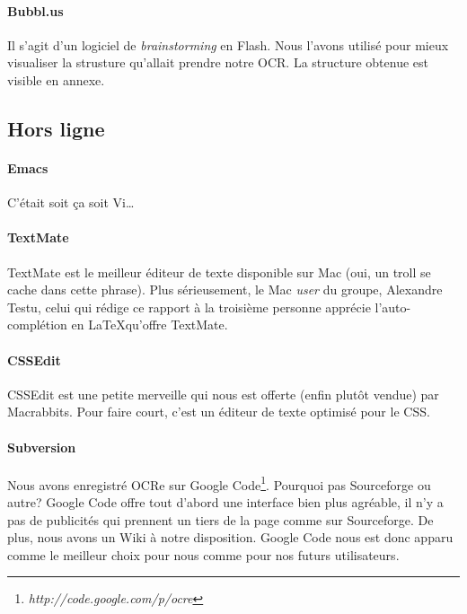 \documentclass[]{report}
\begin{document}
			\paragraph{Bubbl.us\\} %
			\label{par:bubbl_us}
			Il s'agit d'un logiciel de \emph{brainstorming} en Flash. Nous l'avons utilis\'e pour mieux visualiser la strusture qu'allait prendre notre OCR. La structure obtenue est visible en annexe. %
		\subsection{Hors ligne} %
		\label{sub:hors_ligne}
			\paragraph{Emacs\\} %
			\label{par:emacs}
				C'\'etait soit \c ca soit Vi\ldots
			\paragraph{TextMate\\} %
			\label{par:textmate}
				TextMate est le meilleur \'editeur de texte disponible sur Mac (oui, un troll se cache dans cette phrase). Plus s\'erieusement, le Mac \emph{user} du groupe, Alexandre Testu, celui qui r\'edige ce rapport \`a la troisi\`eme personne appr\'ecie l'auto-compl\'etion en \LaTeX qu'offre TextMate.
			\paragraph{CSSEdit} %
			\label{par:cssedit}
			CSSEdit est une petite merveille qui nous est offerte (enfin plut\^ot vendue) par Macrabbits. Pour faire court, c'est un \'editeur de texte optimis\'e pour le CSS.
			\paragraph{Subversion\\} %
			\label{par:subversion}
				Nous avons enregistr\'e OCRe sur Google Code\footnote{\emph{http://code.google.com/p/ocre}}. Pourquoi pas Sourceforge ou autre? Google Code offre tout d'abord une interface bien plus agr\'eable, il n'y a pas de publicit\'es qui prennent un tiers de la page comme sur Sourceforge. De plus, nous avons un Wiki \`a notre disposition. Google Code nous est donc apparu comme le meilleur choix pour nous comme pour nos futurs utilisateurs.
\end{document}
